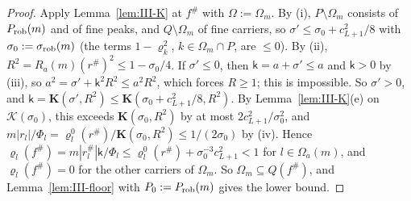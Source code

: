 \documentclass[10pt]{amsart}
\theoremstyle{definition}
\theoremstyle{remark}
\begin{document}
\begin{proof}
Apply Lemma~\ref{lem:III-K} at $f^\#$ with $\Omega:=\Omega_m$.  By (i), $P\setminus
\Omega_m$ consists of $P_{\rm rob}(m)$ and of fine peaks, and $Q\setminus\Omega_m$
of fine carriers, so $\sigma'\le\sigma_0+c_{L+1}^2/8$ with $\sigma_0:=\sigma_{\rm
rob}(m)$ (the terms $1-\varrho_k^2$, $k\in\Omega_m\cap P$, are $\le0$).  By (ii),
$R^2=R_a(m)(r^\#)^2\le1-\sigma_0/4$.  If $\sigma'\le0$, then $\mathsf k=a+\sigma'\le a$
and $\mathsf k>0$ by (iii), so $a^2=\sigma'+\mathsf k^2R^2\le a^2R^2$, which
forces $R\ge1$; this is impossible.  So $\sigma'>0$, and $\mathsf k=\mathbf K(\sigma',
R^2)\le\mathbf K(\sigma_0+c_{L+1}^2/8,R^2)$.  By Lemma~\ref{lem:III-K}(e) on
$\mathcal K(\sigma_0)$, this exceeds $\mathbf K(\sigma_0,R^2)$ by at most $2c_{L+1}^2/
\sigma_0^2$, and $m|r_l|/\Phi_l=\varrho^0_l(r^\#)/\mathbf K(\sigma_0,R^2)\le1/(2\sigma_0)$
by (iv).  Hence $\varrho_l(f^\#)=m|r^\#_l|\mathsf k/\Phi_l\le\varrho^0_l(r^\#)+
\sigma_0^{-3}c_{L+1}^2<1$ for $l\in\Omega_a(m)$, and $\varrho_l(f^\#)=0$ for the
other carriers of $\Omega_m$.  So $\Omega_m\subseteq Q(f^\#)$, and
Lemma~\ref{lem:III-floor} with $P_0:=P_{\rm rob}(m)$ gives the lower bound.
\end{proof}
\end{document}
